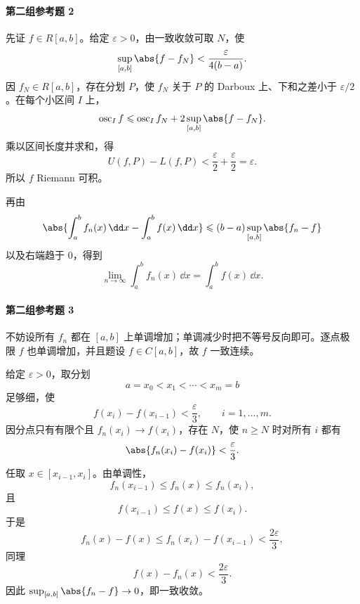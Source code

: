 \paragraph{第二组参考题 2}
\begin{xsolution}
先证 $f\in R[a,b]$。给定 $\varepsilon>0$，由一致收敛可取 $N$，使
\[
  \sup_{[a,b]}\abs{f-f_N}
  <\frac{\varepsilon}{4(b-a)}.
\]
因 $f_N\in R[a,b]$，存在分划 $P$，使 $f_N$ 关于 $P$ 的 Darboux 上、下和之差小于 $\varepsilon/2$。在每个小区间 $I$ 上，
\[
  \operatorname{osc}_I f
  \leqslant\operatorname{osc}_I f_N
  +2\sup_{[a,b]}\abs{f-f_N}.
\]
乘以区间长度并求和，得
\[
  U(f,P)-L(f,P)<\frac{\varepsilon}{2}+
  \frac{\varepsilon}{2}=\varepsilon.
\]
所以 $f$ Riemann 可积。

再由
\[
  \abs{\int_a^bf_n(x)\,\dd x-
  \int_a^bf(x)\,\dd x}
  \leqslant(b-a)\sup_{[a,b]}\abs{f_n-f}
\]
以及右端趋于 $0$，得到
\[
  \boxed{
  \lim_{n\to\infty}\int_a^bf_n(x)\,\dd x
  =\int_a^bf(x)\,\dd x}.
\]
\end{xsolution}

\paragraph{第二组参考题 3}
\begin{xsolution}
不妨设所有 $f_n$ 都在 $[a,b]$ 上单调增加；单调减少时把不等号反向即可。逐点极限 $f$ 也单调增加，并且题设 $f\in C[a,b]$，故 $f$ 一致连续。

给定 $\varepsilon>0$，取分划
\[
  a=x_0<x_1<\cdots<x_m=b
\]
足够细，使
\[
  f(x_i)-f(x_{i-1})<\frac\varepsilon3,
  \qquad i=1,\ldots,m.
\]
因分点只有有限个且 $f_n(x_i)\to f(x_i)$，存在 $N$，使 $n\geqslant N$ 时对所有 $i$ 都有
\[
  \abs{f_n(x_i)-f(x_i)}<\frac\varepsilon3.
\]
任取 $x\in[x_{i-1},x_i]$。由单调性，
\[
  f_n(x_{i-1})\leqslant f_n(x)\leqslant f_n(x_i),
\]
且
\[
  f(x_{i-1})\leqslant f(x)\leqslant f(x_i).
\]
于是
\[
  f_n(x)-f(x)
  \leqslant f_n(x_i)-f(x_{i-1})
  <\frac{2\varepsilon}{3},
\]
同理
\[
  f(x)-f_n(x)<\frac{2\varepsilon}{3}.
\]
因此 $\sup_{[a,b]}\abs{f_n-f}\to0$，即一致收敛。
\end{xsolution}


